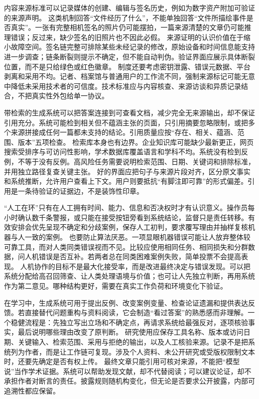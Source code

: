 内容来源标准可以记录媒体的创建、编辑与签名历史，例如为数字资产附加可验证的来源声明。\parencite{c2pa2025} 这类机制回答“文件经历了什么”，不能单独回答“文件所描绘事件是否真实”。一张有完整相机签名的照片仍可能摆拍，一篇来源清楚的文章仍可能推理错误；反过来，缺少签名的旧照片也不因此必假。 来源证明的认识价值在于缩小故障空间。签名链完整可排除某些未经记录的修改，原始设备和时间信息能支持进一步调查；链条断裂则提示不确定，但不能自动判伪。验证界面应展示具体断裂位置，而不是只给绿色或红色徽章。 制度还要考虑密钥泄露、错误元数据、平台剥离和采用不均。记者、档案馆与普通用户的工作流不同，强制来源标记可能无意中降低未采用技术者的可信度。技术标准应与内容核查、来源访谈和异质记录结合，不把真实性外包给单一协议。

带检索的生成系统可以把答案连接到可查看文档，减少完全无来源输出，却不保证引用充分。系统可能检到相关但不蕴涵主张的页面，只引用摘要忽略限制，或把多个来源拼接成任何一篇都未支持的结论。引用质量应按“存在、相关、蕴涵、范围、版本”五项检查。 检索库本身也有边界。企业知识库可能缺少最新更正，网页搜索受排序与可访问性影响，学术数据库覆盖语言和学科不均。系统没有检到反例，不等于没有反例。高风险任务需要说明检索范围、日期、关键词和排除标准，并用独立路径复查关键主张。 好的界面应把句子与来源片段对齐，区分原文事实和系统推断，允许用户查看上下文。用户则要抵抗“有脚注即可靠”的形式偏差。引用是一条待验证的证据边，不是装饰性印章。

“人工在环”只有在人工拥有时间、能力、信息和否决权时才有认识意义。操作员每小时确认数千条警报，或只能在接受按钮旁看到系统结论，监督只是责任转移。有效安排会优先呈现不确定和分歧案例，保存人工初判，要求覆写理由并抽样复核机器与人一致的案例。 也要防止算法厌恶。一项显眼机器错误可能让人放弃整体较可靠工具，而对人类同类错误视而不见。比较应使用相同任务、相同损失和分群数据，问人机错误是否互补。若两者总在同类困难案例失败，简单投票不会提高表现。 人机协作的目标不是最大化接受率，而是改进最终决定与错误发现。可以把系统分配给高召回筛查、让人类处理语境与价值；也可让人先独立判断，再用系统作为第二意见。哪种结构更好，需要在真实工作负荷和环境变化下验证。

在学习中，生成系统可用于提出反例、改变案例变量、检查论证遗漏和提供表达反馈。若直接替代问题重构与资料阅读，它会制造“看过答案”的熟悉感而非理解。一个稳健流程是：先独立写出立场和不确定点，再请求系统给最强反对，逐项核验事实，最后说明哪些理由改变了原判断。 研究使用应保存工具名称、版本或访问日期、关键输入、检索范围、采用与拒绝的输出，以及人工核验来源。记录不是把系统列为作者，而是让工作链可复现。涉及个人资料、未公开研究或受版权限制文本时，还要先确定是否有权上传。 最终文章只能引用可核对来源，不能把“模型说”当作学术证据。系统可以帮助发现文献，却不代替阅读；可以建议论证，却不承担作者对断言的责任。披露规则随机构变化，但无论是否要求公开披露，内部可追溯性都应保留。

